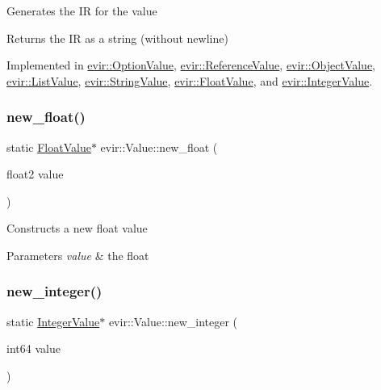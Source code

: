 Generates the IR for the value \begin{DoxyReturn}{Returns}
the IR as a string (without newline) 
\end{DoxyReturn}


Implemented in \hyperlink{classevir_1_1OptionValue_a8bd21c46fc29805637eed4473f1fa371}{evir\+::\+Option\+Value}, \hyperlink{classevir_1_1ReferenceValue_ad669613befab66578629de2ccfb8c2c3}{evir\+::\+Reference\+Value}, \hyperlink{classevir_1_1ObjectValue_a1058f47731ab800327893e388fc2b2d0}{evir\+::\+Object\+Value}, \hyperlink{classevir_1_1ListValue_aebd962d9117d8cd22d35bf217975dcff}{evir\+::\+List\+Value}, \hyperlink{classevir_1_1StringValue_ae635609dfe7acf237b71bdb48625712e}{evir\+::\+String\+Value}, \hyperlink{classevir_1_1FloatValue_a775e25d41c34aca73ed9418963bb652b}{evir\+::\+Float\+Value}, and \hyperlink{classevir_1_1IntegerValue_a586411c365b2afc18fbd5960dd053d94}{evir\+::\+Integer\+Value}.

\mbox{\label{classevir_1_1Value_a90a29b6a33606b8ada904688ce0a302f}} 
\subsubsection{\texorpdfstring{new\+\_\+float()}{new\_float()}}
{\footnotesize\ttfamily static \hyperlink{classevir_1_1FloatValue}{Float\+Value}$\ast$ evir\+::\+Value\+::new\+\_\+float (\begin{DoxyParamCaption}\item[{float2}]{value }\end{DoxyParamCaption})\hspace{0.3cm}{\ttfamily [static]}}

Constructs a new float value 
\begin{DoxyParams}{Parameters}
{\em value} & the float \\
\hline
\end{DoxyParams}
\mbox{\label{classevir_1_1Value_a086f7932417f5b1fa47f627c175d1c65}} 
\subsubsection{\texorpdfstring{new\+\_\+integer()}{new\_integer()}}
{\footnotesize\ttfamily static \hyperlink{classevir_1_1IntegerValue}{Integer\+Value}$\ast$ evir\+::\+Value\+::new\+\_\+integer (\begin{DoxyParamCaption}\item[{int64}]{value }\end{DoxyParamCaption})\hspace{0.3cm}{\ttfamily [static]}}

